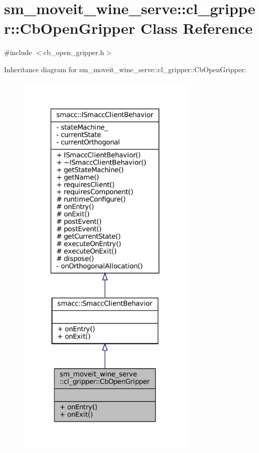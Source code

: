 \hypertarget{classsm__moveit__wine__serve_1_1cl__gripper_1_1CbOpenGripper}{}\section{sm\+\_\+moveit\+\_\+wine\+\_\+serve\+:\+:cl\+\_\+gripper\+:\+:Cb\+Open\+Gripper Class Reference}
\label{classsm__moveit__wine__serve_1_1cl__gripper_1_1CbOpenGripper}


{\ttfamily \#include $<$cb\+\_\+open\+\_\+gripper.\+h$>$}



Inheritance diagram for sm\+\_\+moveit\+\_\+wine\+\_\+serve\+:\+:cl\+\_\+gripper\+:\+:Cb\+Open\+Gripper\+:
\nopagebreak
\begin{figure}[H]
\begin{center}
\leavevmode
\includegraphics[width=241pt]{classsm__moveit__wine__serve_1_1cl__gripper_1_1CbOpenGripper__inherit__graph}
\end{center}
\end{figure}


